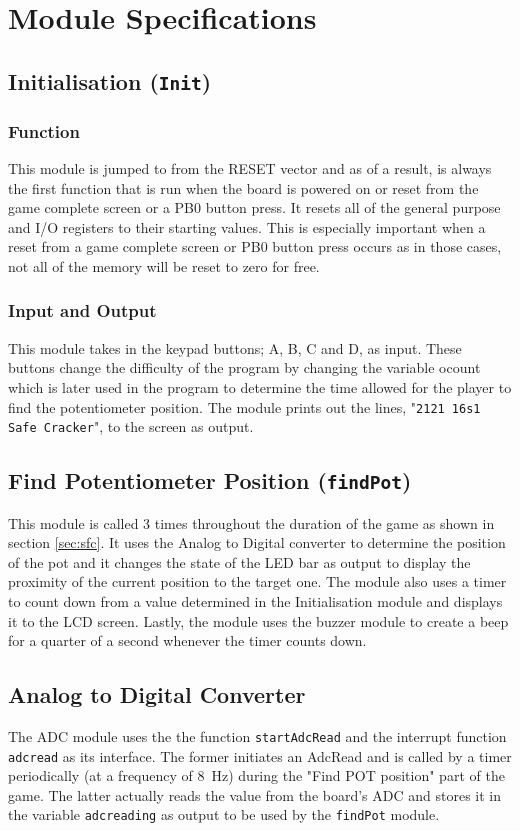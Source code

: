 \documentclass[a4paper]{article}
\begin{document}
\section{Module Specifications}

\subsection{Initialisation (\texttt{Init})}

\subsubsection{Function}
This module is jumped to from the RESET vector and as of a result, is always the first function that
is run when the board is powered on or reset from the game complete screen or a PB0 button press. It resets all 
of the general purpose and I/O registers to their starting values. This is especially important when a reset 
from a game complete screen or PB0 button press occurs as in those cases, not all of the memory will be reset to 
zero for free.

\subsubsection{Input and Output}
This module takes in the keypad buttons; A, B, C and D, as input. These buttons change the difficulty of the
program by changing the variable ocount which is later used in the program to determine the time allowed for 
the player to find the potentiometer position. The module prints out the lines, "\texttt{2121 16s1 Safe Cracker}", to the screen as output.

\subsection{Find Potentiometer Position (\texttt{findPot})}
This module is called 3 times throughout the duration of the game as shown in section \ref{sec:sfc}. It uses the
Analog to Digital converter to determine the position of the pot and it changes the state of the LED bar as
output to display the proximity of the current position to the target one. The module also uses a timer to count
down from a value determined in the Initialisation module and displays it to the LCD screen. Lastly, the module
uses the buzzer module to create a beep for a quarter of a second whenever the timer counts down.

\subsection{Analog to Digital Converter}
The ADC module uses the the function \verb|startAdcRead| and the interrupt function \verb|adcread| as its 
interface. The former initiates an AdcRead and is called by a timer periodically (at a frequency of 
\SI{8}{\hertz}) during the "Find POT position" part of the game. The latter actually reads the value from the 
board's ADC and stores it in the variable \verb|adcreading| as output to be used by the \verb|findPot| module.
\end{document}

